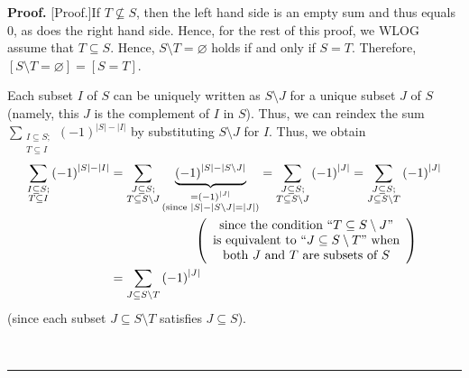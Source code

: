 \documentclass[numbers=enddot,12pt,final,onecolumn,notitlepage]{scrartcl}%
\theoremstyle{definition}
\newenvironment{proof}[1][Proof]{\noindent\textbf{#1.} }{\ \rule{0.5em}{0.5em}}
\let\sumnonlimits\sum
\renewcommand{\sum}{\sumnonlimits\limits}
\newenvironment{vershort}{}{}
\begin{document}
\begin{vershort}
\begin{proof}
[Proof.]If $T\not \subseteq S$, then the left hand side is an empty sum and
thus equals $0$, as does the right hand side. Hence, for the rest of this
proof, we WLOG assume that $T\subseteq S$. Hence, $S\setminus T=\varnothing$
holds if and only if $S=T$. Therefore, $\left[  S\setminus T=\varnothing
\right]  =\left[  S=T\right]  $.

Each subset $I$ of $S$ can be uniquely written as $S\setminus J$ for a unique
subset $J$ of $S$ (namely, this $J$ is the complement of $I$ in $S$). Thus, we
can reindex the sum $\sum_{\substack{I\subseteq S;\\T\subseteq I}}\left(
-1\right)  ^{\left\vert S\right\vert -\left\vert I\right\vert }$ by
substituting $S\setminus J$ for $I$. Thus, we obtain%
\begin{align}
\sum_{\substack{I\subseteq S;\\T\subseteq I}}\left(  -1\right)  ^{\left\vert
S\right\vert -\left\vert I\right\vert }  &  =\sum_{\substack{J\subseteq
S;\\T\subseteq S\setminus J}}\underbrace{\left(  -1\right)  ^{\left\vert
S\right\vert -\left\vert S\setminus J\right\vert }}_{\substack{=\left(
-1\right)  ^{\left\vert J\right\vert }\\\text{(since }\left\vert S\right\vert
-\left\vert S\setminus J\right\vert =\left\vert J\right\vert \text{)}}%
}=\sum_{\substack{J\subseteq S;\\T\subseteq S\setminus J}}\left(  -1\right)
^{\left\vert J\right\vert }=\sum_{\substack{J\subseteq S;\\J\subseteq
S\setminus T}}\left(  -1\right)  ^{\left\vert J\right\vert }\nonumber\\
&  \ \ \ \ \ \ \ \ \ \ \ \ \ \ \ \ \ \ \ \ \left(
\begin{array}
[c]{c}%
\text{since the condition \textquotedblleft}T\subseteq S\setminus
J\text{\textquotedblright}\\
\text{is equivalent to \textquotedblleft}J\subseteq S\setminus
T\text{\textquotedblright\ when}\\
\text{both }J\text{ and }T\text{ are subsets of }S
\end{array}
\right) \nonumber\\
&  =\sum_{J\subseteq S\setminus T}\left(  -1\right)  ^{\left\vert J\right\vert
} \label{pf.lem.altsum.1.1}%
\end{align}
(since each subset $J\subseteq S\setminus T$ satisfies $J\subseteq S$).


\end{proof}
\end{vershort}
\end{document}
